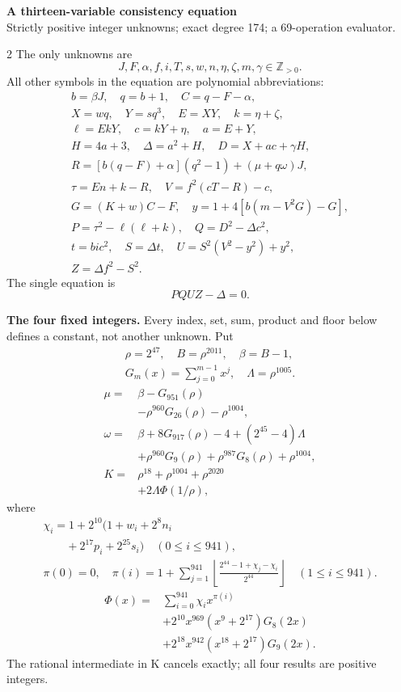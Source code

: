 \documentclass[10pt]{article}
\newcommand{\fl}[1]{\left\lfloor#1\right\rfloor}
\begin{document}
\begin{center}
{\large\bfseries A thirteen-variable consistency equation}\\[-1pt]
{\small Strictly positive integer unknowns; exact degree 174; a 69-operation evaluator.}
\end{center}\vspace{-8pt}
\begin{multicols}{2}
\fontsize{9}{9.5}\selectfont
The only unknowns are
\[
J,F,\alpha,f,i,T,s,w,n,\eta,\zeta,m,\gamma\in\mathbb Z_{>0}.
\]
All other symbols in the equation are polynomial abbreviations:
\[
\begin{gathered}
b=\beta J,\quad q=b+1,\quad C=q-F-\alpha,\\
X=wq,\quad Y=sq^3,\quad E=XY,\quad k=\eta+\zeta,\\
\ell=EkY,\quad c=kY+\eta,\quad a=E+Y,\\
H=4a+3,\quad\Delta=a^2+H,\quad D=X+ac+\gamma H,\\
R=[b(q-F)+\alpha](q^2-1)+(\mu+q\omega)J,\\
\tau=En+k-R,\quad V=f^2(cT-R)-c,\\
G=(K+w)C-F,\quad y=1+4[b(m-V^2G)-G],\\
P=\tau^2-\ell(\ell+k),\quad Q=D^2-\Delta c^2,\\
t=bic^2,\quad S=\Delta t,\quad U=S^2(V^2-y^2)+y^2,\\
Z=\Delta f^2-S^2.
\end{gathered}
\]
The single equation is
\[
\boxed{PQUZ-\Delta=0.}
\]

\textbf{The four fixed integers.}
Every index, set, sum, product and floor below defines a constant, not
another unknown. Put
\[
\begin{gathered}
\rho=2^{47},\quad B=\rho^{2011},\quad\beta=B-1,\\
G_m(x)=\sum_{j=0}^{m-1}x^j,\quad
\Lambda=\rho^{1005}.
\end{gathered}
\]
\begin{align*}
\mu={}&\beta-G_{951}(\rho)\\
&-\rho^{960}G_{26}(\rho)-\rho^{1004},\\
\omega={}&\beta+8G_{917}(\rho)-4+(2^{45}-4)\Lambda\\
&+\rho^{960}G_9(\rho)+\rho^{987}G_8(\rho)
  +\rho^{1004},\\
K={}&\rho^{18}+\rho^{1004}+\rho^{2020}\\
&+2\Lambda\Phi(1/\rho),
\end{align*}
where
\[
\begin{gathered}
\chi_i=1+2^{10}(1+w_i+2^8n_i\\
\qquad+2^{17}p_i+2^{25}s_i)\quad(0\le i\le941),\\
\pi(0)=0,\quad\pi(i)=1+\sum_{j=1}^{941}
\fl{\frac{2^{44}-1+\chi_j-\chi_i}{2^{44}}}\quad(1\le i\le941).
\end{gathered}
\]
\[
\begin{split}
\Phi(x)={}&\sum_{i=0}^{941}\chi_i x^{\pi(i)}\\
&+2^{10}x^{969}(x^9+2^{17})G_8(2x)\\
&+2^{18}x^{942}(x^{18}+2^{17})G_9(2x).
\end{split}
\]
The rational intermediate in K cancels exactly; all four results are positive integers.


\end{multicols}
\end{document}
